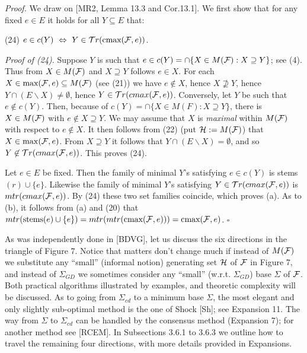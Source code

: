 \documentclass[11pt]{article}
\begin{document}
{\it Proof.} We draw on [MR2, Lemma 13.3 and Cor.13.1]. We first show that for any fixed $e\in E$ it holds for all $Y \subseteq E$ that:

(24) \quad $e \in c(Y) \ \Leftrightarrow \ Y \in {\cal T}r (\mbox{cmax}({\cal F}, e))$.

{\it Proof of (24)}. Suppose $Y$ is such  that $e \in c(Y) = \cap \{X \in M({\cal F}): X \supseteq Y\}$; see (4). Thus from $X \in M({\cal F})$ and $X \supseteq Y$ follows $e \in X$. For each $X \in \mbox{max}({\cal F}, e) \subseteq M({\cal F})$ (see (21)) we have $e \not\in X$, hence $X \not\supseteq Y$, hence $Y \cap (E \backslash X) \neq \emptyset$, hence $Y \in {\cal T}r(cmax({\cal F}, e))$. Conversely, let $Y$ be such that $e \not\in c (Y)$. Then, because of $c(Y) = \cap \{X \in M(F) : X \supseteq Y\}$, there is $X \in M({\cal F})$ with $e \not\in X \supseteq Y$. We may assume that $X$ is {\it maximal} within $M({\cal F})$ with respect to $e \not\in X$. It then follows from (22) (put ${\cal H} : = M({\cal F})$) that $X \in \max ({\cal F}, e)$. From $X \supseteq Y$ it follows that $Y \cap (E \backslash X) = \emptyset$, and so $Y \not\in {\cal T}r(cmax ({\cal F}, e))$.  This proves (24). 

Let $e \in E$ be fixed. Then the family of minimal $Y$'s satisfying $e \in c(Y)$ is stems$(r) \cup \{e\}$. Likewise the family of minimal $Y$'s satisfying $Y \in {\cal T}r(cmax ({\cal F}, e))$ is $mtr(cmax({\cal F}, e))$. By (24) these two set families coincide, which proves (a).
As to (b), it follows from (a) and (20) that
$mtr(\mbox{stems}(e) \cup \{e\}) = mtr(mtr(\mbox{cmax}({\cal F}, e))) = \mbox{cmax}({\cal F},e)$. \hfill $\square$


As was independently done in [BDVG], let us discuss the six directions in the triangle of Figure 7. Notice that matters don't change much if instead of $M({\cal F})$ we substitute any ``small'' (informal notion) generating set ${\cal H}$ of ${\cal F}$ in Figure 7, and instead of $\Sigma_{GD}$ we sometimes consider any ``small'' (w.r.t. $\Sigma_{GD}$) base $\Sigma$ of ${\cal F}$.
Both practical algorithms illustrated by examples, and theoretic complexity will be discussed. As to going from $\Sigma_{cd}$ to a minimum base $\Sigma$, the most elegant and only slightly sub-optimal method is the one of Shock [Sh]; see Expansion 11. The way from $\Sigma$ to $\Sigma_{cd}$ can be handled by the consensus method (Expansion 7); for another method see [RCEM].  
In Subsections 3.6.1 to 3.6.3 we outline how to travel the remaining four directions, with more details provided in Expansions. 
\end{document}
